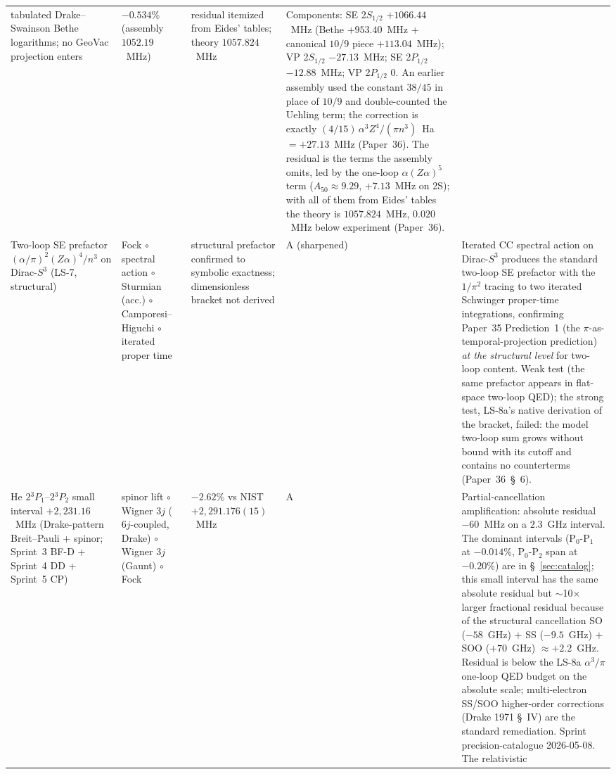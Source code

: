 \documentclass[11pt]{article}
\begin{document}
{\begin{longtable}{p{3.8cm} p{2.5cm} p{1.5cm} p{1.4cm} p{4.5cm}}
tabulated Drake--Swainson Bethe logarithms; no GeoVac projection enters
& $-0.534\%$ (assembly $1052.19$~MHz) & residual itemized
from Eides' tables; theory $1057.824$~MHz & Components:
SE 2$S_{1/2}$ $+1066.44$~MHz (Bethe $+953.40$~MHz + canonical $10/9$
piece $+113.04$~MHz); VP 2$S_{1/2}$ $-27.13$~MHz; SE 2$P_{1/2}$
$-12.88$~MHz; VP 2$P_{1/2}$ $0$.  An earlier assembly used the
constant $38/45$ in place of $10/9$ and double-counted the Uehling
term; the correction is exactly $(4/15)\,\alpha^3 Z^4/(\pi n^3)$~Ha
$= +27.13$~MHz (Paper~36).  The residual is the terms the assembly
omits, led by the one-loop $\alpha(Z\alpha)^5$ term ($A_{50} \approx
9.29$, $+7.13$~MHz on 2S); with all of them from Eides' tables the
theory is $1057.824$~MHz, $0.020$~MHz below experiment (Paper~36). \\
Two-loop SE prefactor $(\alpha/\pi)^2 (Z\alpha)^4 / n^3$ on
Dirac-$S^3$ (LS-7, structural) & Fock $\circ$ spectral action
$\circ$ Sturmian (acc.) $\circ$ Camporesi--Higuchi $\circ$ iterated
proper time & structural prefactor confirmed to symbolic exactness;
dimensionless bracket not derived & A (sharpened) & Iterated CC
spectral action on Dirac-$S^3$ produces the standard two-loop SE
prefactor with the $1/\pi^2$ tracing to two iterated Schwinger
proper-time integrations, confirming Paper~35 Prediction~1 (the
$\pi$-as-temporal-projection prediction) \emph{at the structural
level} for two-loop content.  Weak test (the same prefactor appears in
flat-space two-loop QED); the strong test, LS-8a's native
derivation of the bracket, failed: the model two-loop sum grows without
bound with its cutoff and contains no counterterms (Paper~36~\S~6).
\\
He $2{}^3P_1$--$2{}^3P_2$ small interval $+2{,}231.16$~MHz (Drake-pattern
Breit--Pauli + spinor; Sprint~3 BF-D + Sprint~4 DD + Sprint~5 CP) &
spinor lift $\circ$ Wigner $3j$ ($6j$-coupled, Drake) $\circ$ Wigner $3j$
(Gaunt) $\circ$ Fock &
$-2.62\%$ vs NIST $+2{,}291.176(15)$~MHz & A & Partial-cancellation
amplification: absolute residual $-60$~MHz on a $2.3$~GHz interval.
The dominant intervals (P$_0$-P$_1$ at $-0.014\%$, P$_0$-P$_2$ span at
$-0.20\%$) are in \S~\ref{sec:catalog}; this small interval has the
same absolute residual but $\sim$10$\times$ larger fractional residual
because of the structural cancellation SO ($-58$~GHz) $+$ SS ($-9.5$~GHz)
$+$ SOO ($+70$~GHz) $\approx +2.2$~GHz.  Residual is below the LS-8a
$\alpha^3/\pi$ one-loop QED budget on the absolute scale; multi-electron
SS/SOO higher-order corrections (Drake 1971 \S~IV) are the standard
remediation.  Sprint precision-catalogue 2026-05-08.  The relativistic

\end{longtable}}
\end{document}
